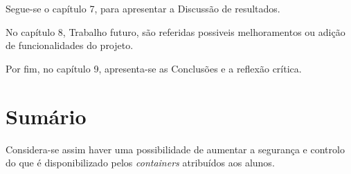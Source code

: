Segue-se o capítulo 7, para apresentar a Discussão de resultados.

No capítulo 8, Trabalho futuro, são referidas possiveis melhoramentos ou adição de funcionalidades
do projeto.

Por fim, no capítulo 9, apresenta-se as Conclusões e a reflexão crítica.


\section*{Sumário}
\label{sec:intro_summary}
Considera-se assim haver uma possibilidade de aumentar a segurança e controlo do que é disponibilizado
pelos \textit{containers} atribuídos aos alunos.
\\
\\
\\
\\
